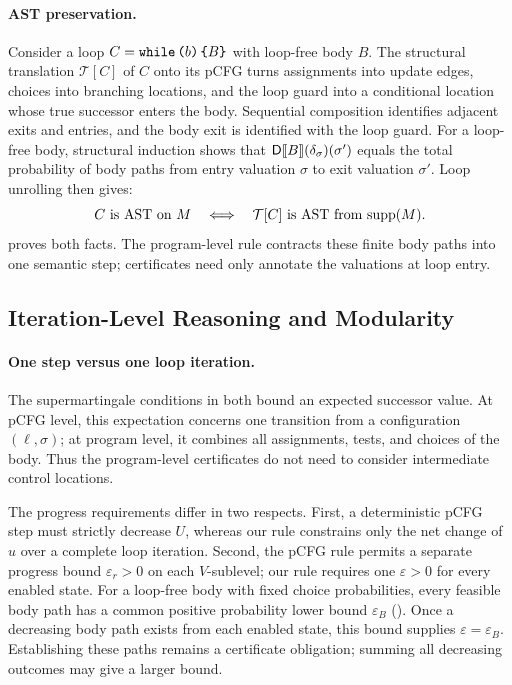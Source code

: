 \paragraph{AST preservation.}
Consider a loop $C=\textnormal{\texttt{while}}\,\textnormal{\texttt{(}} b\textnormal{\texttt{)}}\,\textnormal{\texttt{\{}} B\textnormal{\texttt{\}}}$ with loop-free body $B$.
The structural translation $\mathcal T[C]$ of $C$ onto its pCFG turns assignments into update
edges, choices into branching locations, and the loop guard into a
conditional location whose true successor enters the body. Sequential
composition identifies adjacent exits and entries, and the body exit is
identified with the loop guard. For a loop-free body, structural induction
shows that $\mathsf{D}\llbracket B\rrbracket(\delta_{\sigma})(\sigma')$ equals the total probability
of body paths from entry valuation $\sigma$ to exit valuation $\sigma'$.
Loop unrolling then gives:
\begin{equation}
 C\text{ is AST on }M
 \quad\Longleftrightarrow\quad
 \mathcal T[C]\text{ is AST from }\textnormal{supp}(M).
 \label{eq:ast-preservation}
\end{equation}
 proves both facts. The program-level rule contracts
these finite body paths into one semantic step; certificates need only
annotate the valuations at loop entry.

\subsection{Iteration-Level Reasoning and Modularity}
\label{sec:iteration-level}

\paragraph{One step versus one loop iteration.}
The supermartingale conditions in 
both bound an expected successor value. At pCFG level, this expectation
concerns one transition from a configuration $(\ell,\sigma)$; at program
level, it combines all assignments, tests, and choices of the body.
Thus the program-level certificates do not need to consider
intermediate control locations.

The progress requirements differ in two respects. First, a deterministic
pCFG step must strictly decrease $U$, whereas our rule constrains only
the net change of $u$ over a complete loop iteration. Second, the pCFG rule
permits a separate progress bound $\varepsilon_r>0$ on each $V$-sublevel;
our rule requires one $\varepsilon>0$ for every enabled state.
For a loop-free body with fixed choice probabilities, every feasible
body path has a common positive probability lower bound $\varepsilon_B$
(). Once a decreasing body path exists from
each enabled state, this bound supplies $\varepsilon=\varepsilon_B$.
Establishing these paths remains a certificate obligation; summing all
decreasing outcomes may give a larger bound.

